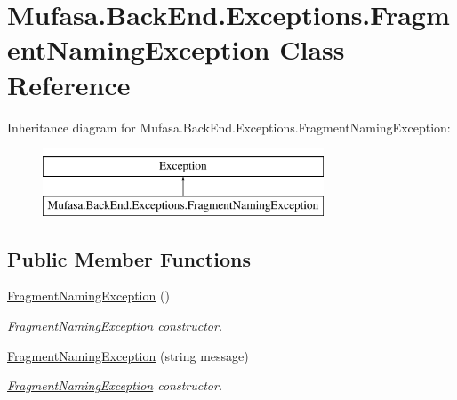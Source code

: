 \hypertarget{class_mufasa_1_1_back_end_1_1_exceptions_1_1_fragment_naming_exception}{\section{Mufasa.\+Back\+End.\+Exceptions.\+Fragment\+Naming\+Exception Class Reference}
\label{class_mufasa_1_1_back_end_1_1_exceptions_1_1_fragment_naming_exception}
}
Inheritance diagram for Mufasa.\+Back\+End.\+Exceptions.\+Fragment\+Naming\+Exception\+:\begin{figure}[H]
\begin{center}
\leavevmode
\includegraphics[height=2.000000cm]{class_mufasa_1_1_back_end_1_1_exceptions_1_1_fragment_naming_exception}
\end{center}
\end{figure}
\subsection*{Public Member Functions}
\begin{DoxyCompactItemize}
\item 
\hyperlink{class_mufasa_1_1_back_end_1_1_exceptions_1_1_fragment_naming_exception_a8c1ca1a4f964e73a9da693808f33d386}{Fragment\+Naming\+Exception} ()
\begin{DoxyCompactList}\small\item\em \hyperlink{class_mufasa_1_1_back_end_1_1_exceptions_1_1_fragment_naming_exception}{Fragment\+Naming\+Exception} constructor. \end{DoxyCompactList}\item 
\hyperlink{class_mufasa_1_1_back_end_1_1_exceptions_1_1_fragment_naming_exception_aaa478e87d5cfe6831f0adf4aa5af0cec}{Fragment\+Naming\+Exception} (string message)
\begin{DoxyCompactList}\small\item\em \hyperlink{class_mufasa_1_1_back_end_1_1_exceptions_1_1_fragment_naming_exception}{Fragment\+Naming\+Exception} constructor. \end{DoxyCompactList}\end{DoxyCompactItemize}



